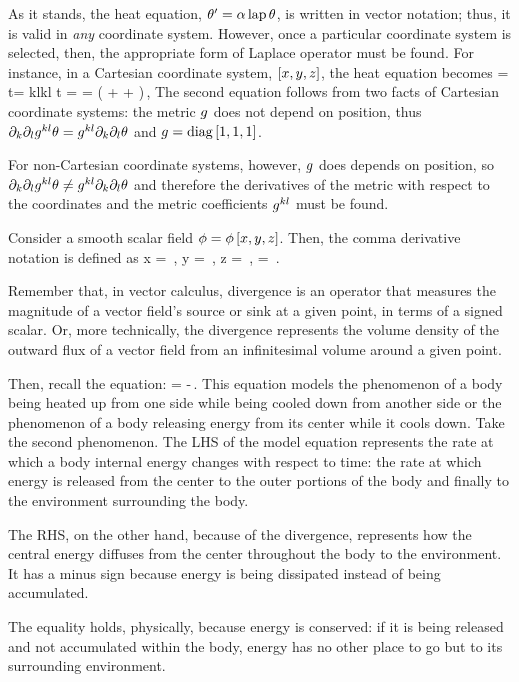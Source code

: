 \begin{technote}
As it stands, the heat equation, ${\theta}^{\prime} = \alpha\operatorname{lap}\theta$, is written in vector notation; thus, it is valid in \emph{any} coordinate system. However, once a particular coordinate system is selected, then, the appropriate form of Laplace operator must be found. For instance, in a Cartesian coordinate system, $\left[{x,y,z}\right]$, the heat equation becomes
\beq
   \rate\temp = \ipd t\temp = \kthdiff\ipd k\ipd l\rmet kl\temp\qquad{}\qquad
\cder \temp t = \kthdiff\cder\temp{\pos\pos}
              = \kthdiff\left(\cder{} + \cder{} + \cder{}\right)\,,
\eeq
The second equation follows from two facts of Cartesian coordinate systems: the metric $g$ does not depend on position, thus $\partial_{k}\partial_{l}g^{{k}{l}}\theta = g^{{k}{l}}\partial_{k}\partial_{l}\theta$ and $g = \operatorname{diag}\left[{1,1,1}\right]$.

For non-Cartesian coordinate systems, however, $g$ does depends on position, so $\partial_{k}\partial_{l}g^{{k}{l}}\theta \neq g^{{k}{l}}\partial_{k}\partial_{l}\theta$ and therefore the derivatives of the metric with respect to the coordinates and the metric coefficients $g^{{k}{l}}$ must be found.
\end{technote}

\begin{notation}
Consider a smooth scalar field $\phi = \phi\left[{x,y,z}\right]$. Then, the comma derivative notation is defined as
\beq
  \cder \phi x = \,,\quad
  \cder \phi y = \,,\quad
  \cder \phi z = \,,\quad
\cder {} = \phi\quad{}\,.
\eeq
\end{notation}

\begin{geometry}
Remember that, in vector calculus, divergence is an operator that measures the magnitude of a vector field's source or sink at a given point, in terms of a signed scalar. Or, more technically, the divergence represents the volume density of the outward flux of a vector field from an infinitesimal volume around a given point.

Then, recall the equation:
\beq
\rate\ien = -\div\flux\then\,.
\eeq
This equation models the phenomenon of a body being heated up from one side while being cooled down from another side or the phenomenon of a body releasing energy from its center while it cools down. Take the second phenomenon. The LHS of the model equation represents the rate at which a body internal energy changes with respect to time: the rate at which energy is released from the center to the outer portions of the body and finally to the environment surrounding the body.

The RHS, on the other hand, because of the divergence, represents how the central energy diffuses from the center throughout the body to the environment. It has a minus sign because energy is being dissipated instead of being accumulated.

The equality holds, physically, because energy is conserved: if it is being released and not accumulated within the body, energy has no other place to go but to its surrounding environment.
\end{geometry}

